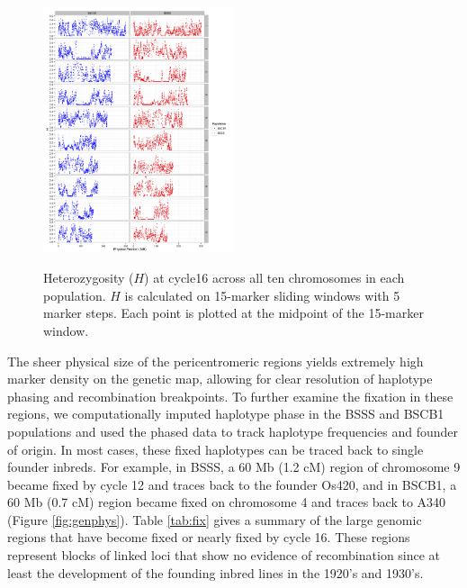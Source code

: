 \begin{figure}[tb]   
  \begin{center}
   \vspace{-0mm}
   \includegraphics[width=0.5\textwidth]{fig3}
   \renewcommand{\baselinestretch}{0.9}
   \vspace{-3mm}
   \caption{ Heterozygosity ($H$) at cycle16 across all ten chromosomes in each population.  $H$ is calculated on 15-marker sliding windows with 5 marker steps. Each point is plotted at the midpoint of the 15-marker window. 
} 
\vspace{-6mm}
    \label{fig:heterotic}
  \end{center}
\end{figure}

The sheer physical size of the pericentromeric regions yields extremely high marker density on the genetic map, allowing for clear resolution of haplotype phasing and recombination breakpoints. 
To further examine the fixation in these regions, we computationally imputed haplotype phase in the BSSS and BSCB1 populations and used the phased data to track haplotype frequencies and founder of origin. 
In most cases, these fixed haplotypes can be traced back to single founder inbreds. 
For example, in BSSS, a 60 Mb (1.2 cM) region of chromosome 9 became fixed by cycle 12 and traces back to the founder Os420, and in BSCB1, a 60 Mb (0.7 cM) region became fixed on chromosome 4 and traces back to A340 (Figure \ref{fig:genphys}).
Table \ref{tab:fix} gives a summary of the large genomic regions that have become fixed or nearly fixed by cycle 16. 
These regions represent blocks of linked loci that show no evidence of recombination since at least the development of the founding inbred lines in the 1920’s and 1930’s.
	
